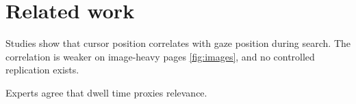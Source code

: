 \section{Related work}

Studies show that cursor position correlates with gaze position during search.
The correlation is weaker on image-heavy pages \ref{fig:images}, and no
controlled replication exists.

Experts agree that dwell time proxies relevance.
